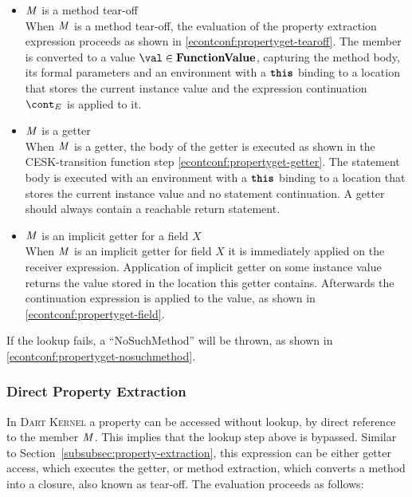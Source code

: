 \documentclass[a4paper,oneside,fleqn]{article}
\newcommand{\kernel}{\textsc{Dart Kernel}}
\newcommand{\synt}[1]{\ensuremath{\text{\textbf{\texttt{#1}}}}}
\newcommand{\this}{\synt{this}}
\newcommand{\dfunval}{\mathbf{FunctionValue}}
\newcommand{\idmeta}{\ensuremath{\mathit{X}}}
\begin{document}
\begin{itemize}
    \item $\mathit{M}$ is a method tear-off\\
        When $\mathit{M}$ is a method tear-off, the evaluation of the property extraction expression proceeds as shown in \eqref{econtconf:propertyget-tearoff}.
        The member is converted to a value $\val \in \dfunval$, capturing the method body, its formal parameters and an environment with a $\this$ binding to a location that stores the current instance value and the expression continuation $\econt$ is applied to it.

    \item $\mathit{M}$ is a getter\\
        When $\mathit{M}$ is a getter, the body of the getter is executed as shown in the CESK-transition function step \eqref{econtconf:propertyget-getter}.
        The statement body is executed with an environment with a $\this$ binding to a location that stores the current instance value and no statement continuation.
        A getter should always contain a reachable return statement.

    \item $\mathit{M}$ is an implicit getter for a field $\idmeta$\\
        When $\mathit{M}$ is an implicit getter for field $\idmeta$ it is immediately applied on the receiver expression.
        Application of implicit getter on some instance value returns the value stored in the location this getter contains.
        Afterwards the continuation expression is applied to the value, as shown in \eqref{econtconf:propertyget-field}.

\end{itemize}

If the lookup fails, a ``NoSuchMethod'' will be thrown, as shown in \eqref{econtconf:propertyget-nosuchmethod}.


\subsubsection{Direct Property Extraction}
\label{subsubsec:direct-property-extraction}

In \kernel{} a property can be accessed without lookup, by direct reference to the member $\mathit{M}$.
This implies that the lookup step above is bypassed.
Similar to Section~\ref{subsubsec:property-extraction}, this expression can be either getter access, which executes the getter, or method extraction, which converts a method into a closure, also known as tear-off.
The evaluation proceeds as follows:
\end{document}
